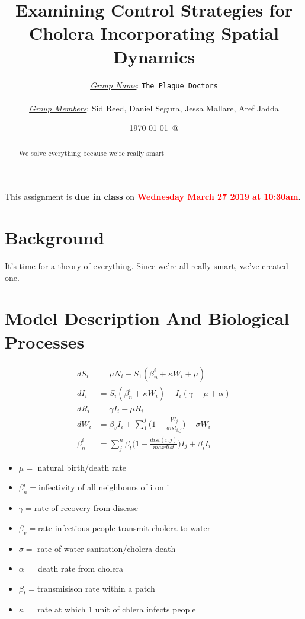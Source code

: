 \documentclass[12pt]{article}\usepackage[]{graphicx}\usepackage[]{color}
\begin{document}
\title{Examining Control Strategies for Cholera Incorporating Spatial Dynamics}
\author{
\underline{\emph{Group Name}}: \texttt{{\color{blue}The Plague Doctors}}\\\\
\underline{\emph{Group Members}}: {\color{blue}Sid Reed, Daniel Segura, Jessa Mallare, Aref Jadda}}
\date{\today\ @ \thistime}
\maketitle
\bigskip
\noindent
This assignment is {\bfseries\color{red} due in class} on \textcolor{red}{\bf Wednesday March 27 2019 at 10:30am}.
\bigskip

\linenumbers

\begin{abstract}
We solve everything because we're really smart
\end{abstract}

\clearpage
\tableofcontents
\clearpage

\section{Background}
It's time for a theory of everything.  Since we're all really smart, we've created one.


\section{Model Description And Biological Processes}
\begin{align*}
    dS_i&=\mu N_i-S_1(\beta_n^i+\kappa W_i+\mu)\\
    dI_i&=S_i(\beta_n^i+\kappa W_i)-I_i(\gamma+\mu+\alpha)\\
    dR_i&=\gamma I_i-\mu R_i\\
    dW_i&=\beta_v I_i+\sum_{1}^{j}{\Big(1-\frac{W_j}{dist_{i,j}}\Big)} -\sigma W_i\\
    \beta_n^i&=\sum_{j}^{n}{\beta_t\Big(1-\frac{dist(i,j)}{max dist}\Big)I_j}+\beta_iI_i
\end{align*}
\begin{itemize}
  \item $\mu=$ natural birth/death rate
  \item $\beta_n^i=$infectivity of all neighbours of i on i
  \item$\gamma=$rate of recovery from disease
  \item$\beta_v=$rate infectious people transmit cholera to water
  \item$\sigma=$ rate of water sanitation/cholera death
  \item$\alpha=$ death rate from cholera
  \item$\beta_t=$transmisison rate within a patch
  \item $\kappa=$ rate at which 1 unit of chlera infects people
\end{itemize}
\end{document}
